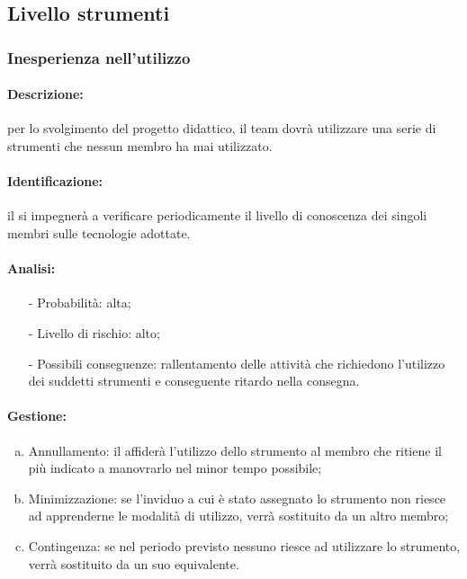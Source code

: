 \documentclass[../PianoProgetto.tex]{subfiles}
\begin{document}
\subsection{Livello strumenti}

\subsubsection{Inesperienza nell’utilizzo}

	\paragraph*{Descrizione:} per lo svolgimento del progetto didattico, il team dovrà utilizzare una serie di strumenti che nessun membro ha mai utilizzato.
	
	\paragraph*{Identificazione:} il \responsabilediprogetto si impegnerà a verificare periodicamente il livello di conoscenza dei singoli membri sulle tecnologie adottate.
	
	\paragraph*{Analisi:}
	\begin{itemize}
		\item[-] Probabilità: alta;
		\item[-] Livello di rischio: alto;
		\item[-] Possibili conseguenze: rallentamento delle attività che richiedono l’utilizzo dei suddetti strumenti e conseguente ritardo nella consegna.
	\end{itemize}
	
	\paragraph*{Gestione:}
	\begin{enumerate}[(a)]
		\item Annullamento: il \responsabilediprogetto affiderà l’utilizzo dello strumento al membro che ritiene il più indicato a manovrarlo nel minor tempo possibile;
		\item Minimizzazione: se l’inviduo a cui è stato assegnato lo strumento non riesce ad apprenderne le modalità di utilizzo, verrà sostituito da un altro membro;
		\item Contingenza: se nel periodo previsto nessuno riesce ad utilizzare lo strumento, verrà sostituito da un suo equivalente. 
	\end{enumerate}	
	
\end{document}
